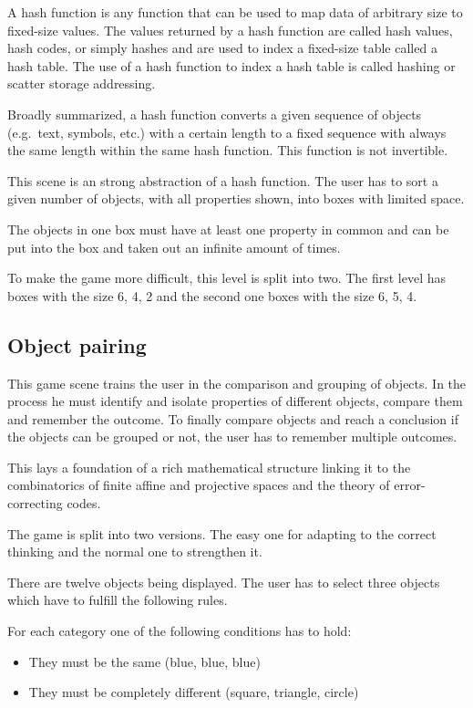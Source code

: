 A hash function is any function that can be used to map data of arbitrary size to fixed-size values.
The values returned by a hash function are called hash values, hash codes, or simply hashes and
are used to index a fixed-size table called a hash table.
The use of a hash function to index a hash table is called hashing or scatter storage addressing.\cite{artofcomputerscience}

Broadly summarized, a hash function converts a given sequence of objects (e.g.\ text, symbols, etc.)
with a certain length to a fixed sequence with always the same length within the same hash function.
This function is not invertible.

This scene is an strong abstraction of a hash function.
The user has to sort a given number of objects, with all properties shown, into boxes with limited space.

The objects in one box must have at least one property in common and
can be put into the box and taken out an infinite amount of times.

To make the game more difficult, this level is split into two.
The first level has boxes with the size 6, 4, 2 and the second one boxes with the size 6, 5, 4.

\subsection{Object pairing}\label{subsec:object-pairing}
This game scene trains the user in the comparison and grouping of objects.
In the process he must identify and isolate properties of different objects, compare them and remember the outcome.
To finally compare objects and reach a conclusion if the objects can be grouped or not,
the user has to remember multiple outcomes.

This lays a foundation of a rich mathematical structure linking it to the combinatorics of finite affine and
projective spaces and the theory of error-correcting codes.\cite{cardgameset}

The game is split into two versions. The easy one for adapting to the correct thinking
and the normal one to strengthen it.

There are twelve objects being displayed.
The user has to select three objects which have to fulfill the following rules.

For each category one of the following conditions has to hold:
\begin{itemize}
    \item They must be the same (blue, blue, blue)
    \item They must be completely different (square, triangle, circle)
\end{itemize}


